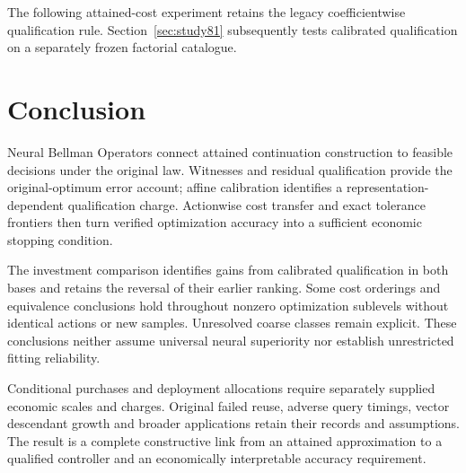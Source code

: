 \documentclass[ecta,nameyear,draft]{econsocart}
\begin{document}








\noindent The following attained-cost experiment retains the legacy coefficientwise qualification rule. Section~\ref{sec:study81} subsequently tests calibrated qualification on a separately frozen factorial catalogue.




\section{Conclusion}\label{sec:conclusion65}
Neural Bellman Operators connect attained continuation construction to feasible decisions under the original law. Witnesses and residual qualification provide the original-optimum error account; affine calibration identifies a representation-dependent qualification charge. Actionwise cost transfer and exact tolerance frontiers then turn verified optimization accuracy into a sufficient economic stopping condition.

The investment comparison identifies gains from calibrated qualification in both bases and retains the reversal of their earlier ranking. Some cost orderings and equivalence conclusions hold throughout nonzero optimization sublevels without identical actions or new samples. Unresolved coarse classes remain explicit. These conclusions neither assume universal neural superiority nor establish unrestricted fitting reliability.

Conditional purchases and deployment allocations require separately supplied economic scales and charges. Original failed reuse, adverse query timings, vector descendant growth and broader applications retain their records and assumptions. The result is a complete constructive link from an attained approximation to a qualified controller and an economically interpretable accuracy requirement.



\end{document}
